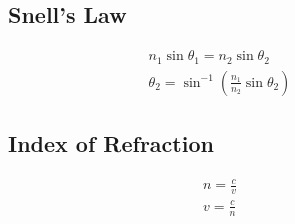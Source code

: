 \documentclass{article}
\begin{document}
\begin{figure}[ht]
    \begin{minipage}[t]{0.4\textwidth}
        \subsection{Snell's Law}
        \begin{gather}
            n_1\sin\theta_1 = n_2\sin\theta_2 \\
            \theta_2 = \sin^{-1}\left(\frac{n_1}{n_2}\sin\theta_2\right)
        \end{gather}
    \end{minipage}
    \hfill\vline\hfill
    \begin{minipage}[t]{0.4\textwidth}
        \subsection{Index of Refraction}
        \begin{gather}
            n = \frac{c}{v} \\
            v = \frac{c}{n}
        \end{gather}
    \end{minipage}
\end{figure}
\end{document}

